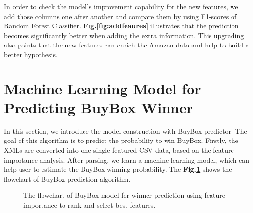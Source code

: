 %

In order to check the model's improvement capability for the new features, we add those columns one after another and compare them by using F1-scores of Random Forest Classifier. \textbf{Fig.\ref{fig:addfeaures}} illustrates that the prediction becomes significantly better when adding the extra information. 
This upgrading also points that the new features can enrich the Amazon data and help to build a better hypothesis.

\section{Machine Learning Model for Predicting BuyBox Winner}
\label{sec:buyboxmodel}

In this section, we introduce the model construction with BuyBox predictor. The goal of this algorithm is to predict 
the probability to win BuyBox. Firstly, the XMLs are converted into one single featured CSV data, based on the feature importance analysis.
After parsing, we learn a machine learning model, which can help user to estimate the BuyBox winning probability. 
The \textbf{Fig.\ref{fig:buyboxflow}} shows the flowchart of BuyBox prediction algorithm.

\begin{figure}[!h]
	\begin{center}
	\end{center}
	\caption{\label{fig:buyboxflow}The flowchart of BuyBox model for winner prediction using feature importance to rank and select best features.}
\end{figure}

